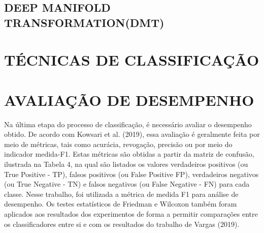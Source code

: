 \subsection{DEEP MANIFOLD TRANSFORMATION(DMT)}


\section{TÉCNICAS DE CLASSIFICAÇÃO}

\section{AVALIAÇÃO DE DESEMPENHO}
Na última etapa do processo de classificação, é necessário avaliar o desempenho obtido. De
acordo com Kowsari et al. (2019), essa avaliação é geralmente feita por meio de métricas, tais
como acurácia, revogação, precisão ou por meio do indicador medida-F1. Estas métricas são
obtidas a partir da matriz de confusão, ilustrada na Tabela 4, na qual são listados os valores
verdadeiros positivos (ou True Positive - TP), falsos positivos (ou False Positive FP),
verdadeiros negativos (ou True Negative - TN) e falsos negativos (ou False Negative - FN)
para cada classe.
Nesse trabalho, foi utilizada a métrica de medida F1 para análise de desempenho. Os testes
estatísticos de Friedman e Wilcoxon também foram aplicados aos resultados dos
experimentos de forma a permitir comparações entre os classificadores entre si e com os
resultados do trabalho de Vargas (2019).

